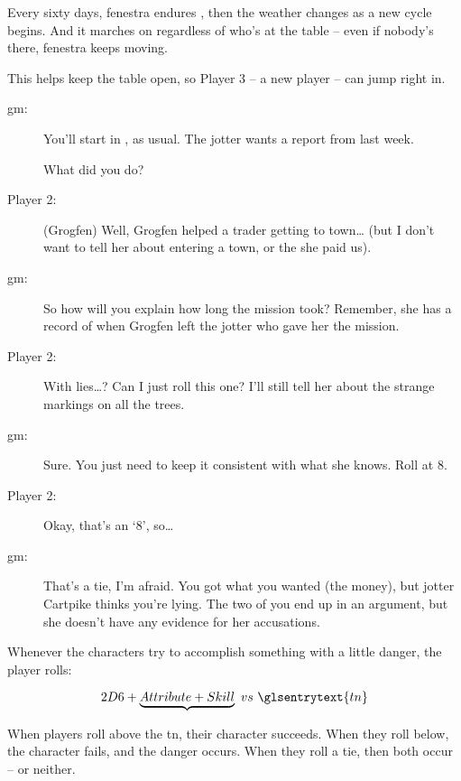 \begin{multicols}{3}
Every sixty days, \gls{fenestra} endures , then the weather changes as a new \gls{cycle} begins.
And it marches on regardless of who's at the table -- even if nobody's there, \gls{fenestra} keeps moving.

This helps keep the table open, so Player 3 -- a new player -- can jump right in.

\bigLine
\vspace{\baselineskip}

\begin{description}
  \item[\gls{gm}:]
  You'll start in , as usual.
  The \Gls{jotter} wants a report from last week.

  What did you do?
  \item[Player 2:]
  (Grogfen)
  Well, Grogfen helped a trader getting to town\ldots
  (but I don't want to tell her about entering a town, or the  she paid us).
  \item[\gls{gm}:]
  So how will you explain how long the mission took?
  Remember, she has a record of when Grogfen left the \gls{jotter} who gave her the mission.
  \item[Player 2:]
  With lies\ldots?
  Can I just roll this one?
  I'll still tell her about the strange markings on all the trees.
  \item[\gls{gm}:]
  Sure.
  You just need to keep it consistent with what she knows.
  Roll  at  8.
  \item[Player 2:]
  Okay, that's an `8', so\ldots
  \item[\gls{gm}:]
  That's a tie, I'm afraid.
  You got what you wanted (the money), but \gls{jotter} Cartpike thinks you're lying.
  The two of you end up in an argument, but she doesn't have any evidence for her accusations.
\end{description}

\bigLine
\vspace{\baselineskip}

\noindent
Whenever the characters try to accomplish something with a little danger, the player rolls:

$$2D6 + \underbrace{Attribute + Skill} ~vs~ \glsentrytext{tn}$$

\noindent
When players roll above the \gls{tn}, their character succeeds.
When they roll below, the character fails, and the danger occurs.
When they roll a tie, then both occur -- or neither.


\end{multicols}
